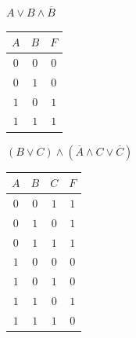     \begin{minipage}[t]{0.4\textwidth}
        \begin{enumerate}
            \begin{spacing}{0.5}
                \item $A \vee B \wedge \overline B$\\
            \end{spacing}
            \begin{tabular}{|c|c|c|}
                \hline
                $A$ & $B$ & $F$ \\
                \hline
                $0$ & $0$ & $0$ \\
                \hline
                $0$ & $1$ & $0$ \\
                \hline
                $1$ & $0$ & $1$ \\
                \hline
                $1$ & $1$ & $1$ \\
                \hline
            \end{tabular}
        \end{enumerate}
    \end{minipage}
    \begin{minipage}[t]{0.4\textwidth}
        \begin{enumerate}
            \setcounter{enumi}{1}
            \begin{spacing}{0.5}
                \item $(B \vee C) \wedge (\overline A \wedge C \vee \overline C)$\\
            \end{spacing}
            \begin{tabular}{|c|c|c|c|}
                \hline
                $A$ & $B$ & $C$ & $F$ \\
                \hline
                $0$ & $0$ & $1$ & $1$ \\
                \hline
                $0$ & $1$ & $0$ & $1$ \\
                \hline
                $0$ & $1$ & $1$ & $1$ \\
                \hline
                $1$ & $0$ & $0$ & $0$ \\
                \hline
                $1$ & $0$ & $1$ & $0$ \\
                \hline
                $1$ & $1$ & $0$ & $1$ \\
                \hline
                $1$ & $1$ & $1$ & $0$ \\
                \hline
            \end{tabular}
        \end{enumerate}
    \end{minipage}

